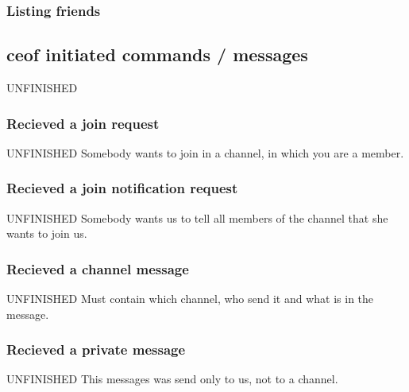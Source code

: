 \documentclass[12pt,a4paper]{article}
\begin{document}
\subsubsection{Listing friends}
\subsection{ceof initiated commands / messages}
UNFINISHED
\subsubsection{Recieved a join request}
UNFINISHED
Somebody wants to join in a channel, in which you are a member.
\subsubsection{Recieved a join notification request}
UNFINISHED
Somebody wants us to tell all members of the channel that she wants to join us.
\subsubsection{Recieved a channel message}
UNFINISHED
Must contain which channel, who send it and what is in the message.
\subsubsection{Recieved a private message}
UNFINISHED
This messages was send only to us, not to a channel.
\end{document}
